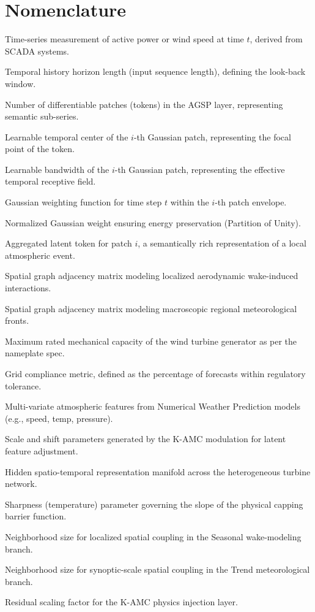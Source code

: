 \section*{Nomenclature}
\begin{IEEEdescription}
\item[$X_t$] Time-series measurement of active power or wind speed at time $t$, derived from SCADA systems.
\item[$L$] Temporal history horizon length (input sequence length), defining the look-back window.
\item[$N_p$] Number of differentiable patches (tokens) in the AGSP layer, representing semantic sub-series.
\item[$\mu_i$] Learnable temporal center of the $i$-th Gaussian patch, representing the focal point of the token.
\item[$\sigma_i$] Learnable bandwidth of the $i$-th Gaussian patch, representing the effective temporal receptive field.
\item[$W_i(t)$] Gaussian weighting function for time step $t$ within the $i$-th patch envelope.
\item[$\tilde{W}_i(t)$] Normalized Gaussian weight ensuring energy preservation (Partition of Unity).
\item[$T_i$] Aggregated latent token for patch $i$, a semantically rich representation of a local atmospheric event.
\item[$A_{near}$] Spatial graph adjacency matrix modeling localized aerodynamic wake-induced interactions.
\item[$A_{far}$] Spatial graph adjacency matrix modeling macroscopic regional meteorological fronts.
\item[$P_{rated}$] Maximum rated mechanical capacity of the wind turbine generator as per the nameplate spec.
\item[$\Lambda$] Grid compliance metric, defined as the percentage of forecasts within regulatory tolerance.
\item[$Z_{nwp}$] Multi-variate atmospheric features from Numerical Weather Prediction models (e.g., speed, temp, pressure).
\item[$\gamma, \beta$] Scale and shift parameters generated by the K-AMC modulation for latent feature adjustment.
\item[$H$] Hidden spatio-temporal representation manifold across the heterogeneous turbine network.
\item[$\tau$] Sharpness (temperature) parameter governing the slope of the physical capping barrier function.
\item[$K_{near}$] Neighborhood size for localized spatial coupling in the Seasonal wake-modeling branch.
\item[$K_{far}$] Neighborhood size for synoptic-scale spatial coupling in the Trend meteorological branch.
\item[$\lambda$] Residual scaling factor for the K-AMC physics injection layer.
\end{IEEEdescription}
